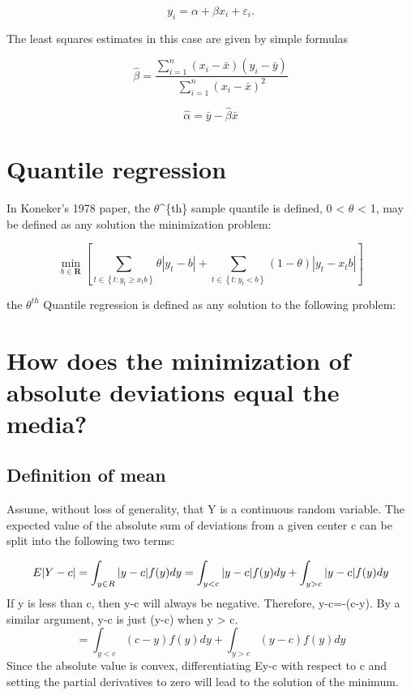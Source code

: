 \documentclass[
  letterpaper,
  DIV=11,
  numbers=noendperiod]{scrreprt}
\begin{document}
\[
y_i=\alpha+\beta x_i+\varepsilon_i .
\]

The least squares estimates in this case are given by simple formulas

\[
\widehat{\beta} =\frac{\sum_{i=1}^n\left(x_i-\bar{x}\right)\left(y_i-\bar{y}\right)}{\sum_{i=1}^n\left(x_i-\bar{x}\right)^2}
\]

\[
\widehat{\alpha} =\bar{y}-\widehat{\beta} \bar{x}
\]

\hypertarget{quantile-regression}{%
\section{Quantile regression}\label{quantile-regression}}

In Koneker's 1978 paper, the \(\theta\)\^{}\{th\} sample quantile is
defined, 0 \textless{} \(\theta\) \textless{} 1, may be defined as any
solution the minimization problem:

\[
\begin{equation}
\min _{b \in \mathbf{R}}\left[\sum_{t \in\left\{t: y_t \geqslant x_t b\right\}} \theta\left|y_t-b\right|+\sum_{t \in\left\{t: y_t< b\right\}}(1-\theta)\left|y_t-x_t b\right|\right] 
\end{equation}
\]

the \(\theta^{th}\) Quantile regression is defined as any solution to
the following problem:

\hypertarget{how-does-the-minimization-of-absolute-deviations-equal-the-media}{%
\section{How does the minimization of absolute deviations equal the
media?}\label{how-does-the-minimization-of-absolute-deviations-equal-the-media}}

\hypertarget{definition-of-mean}{%
\subsection{Definition of mean}\label{definition-of-mean}}

Assume, without loss of generality, that Y is a continuous random
variable. The expected value of the absolute sum of deviations from a
given center c can be split into the following two terms:

\[
E|Y - c| = \int_{y\in R}|y-c|f(y)dy \\
=\int_{y < c} |y-c|f(y)dy + \int_{y>c}|y-c|f(y)dy  \\
\] If y is less than c, then y-c will always be negative. Therefore,
\textbar y-c\textbar=-(c-y). By a similar argument,
\textbar y-c\textbar{} is just (y-c) when y \textgreater{} c. \[
=\int_{y<c}(c-y)f(y)dy + \int_{y>c}(y-c)f(y)dy
\] Since the absolute value is convex, differentiating
E\textbar y-c\textbar{} with respect to c and setting the partial
derivatives to zero will lead to the solution of the minimum.
\end{document}

